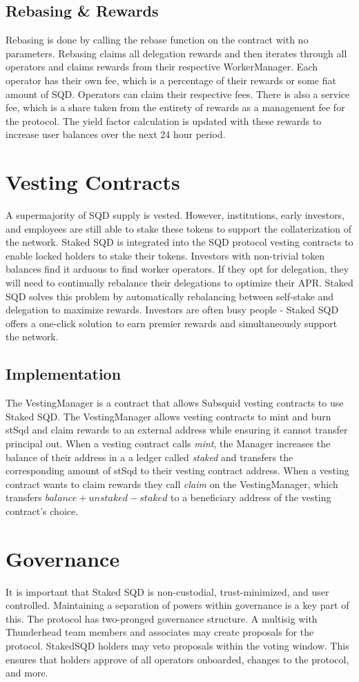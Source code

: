 \documentclass{article}
\begin{document}
\subsection{Rebasing \& Rewards}
Rebasing is done by calling the rebase function on the contract with no parameters. Rebasing claims all delegation rewards and then iterates through all operators and claims rewards from their respective WorkerManager. Each operator has their own fee, which is a percentage of their rewards or some fiat amount of SQD. Operators can claim their respective fees. There is also a service fee, which is a share taken from the entirety of rewards as a management fee for the protocol. The yield factor calculation is updated with these rewards to increase user balances over the next 24 hour period.
\section{Vesting Contracts}
A supermajority of SQD supply is vested\cite{tokenomics}. However, institutions, early investors, and employees are still able to stake these tokens to support the collaterization of the network. Staked SQD is integrated into the SQD protocol vesting contracts to enable locked holders to stake their tokens. Investors with non-trivial token balances find it arduous to find worker operators. If they opt for delegation, they will need to continually rebalance their delegations to optimize their APR. Staked SQD solves this problem by automatically rebalancing between self-stake and delegation to maximize rewards. Investors are often busy people - Staked SQD offers a one-click solution to earn premier rewards and simultaneously support the network.
\subsection{Implementation}
The VestingManager is a contract that allows Subsquid vesting contracts to use Staked SQD. The VestingManager allows vesting contracts to mint and burn stSqd and claim rewards to an external address while ensuring it cannot transfer principal out. When a vesting contract calls \textit{mint}, the Manager increases the balance of their address in a a ledger called \textit{staked} and transfers the corresponding amount of stSqd to their vesting contract address. When a vesting contract wants to claim rewards they call \textit{claim} on the VestingManager, which transfers $balance + unstaked - staked$ to a beneficiary address of the vesting contract's choice. 
\section{Governance}
It is important that Staked SQD is non-custodial, trust-minimized, and user controlled. Maintaining a separation of powers within governance is a key part of this. The protocol has two-pronged governance structure. A multisig with Thunderhead team members and associates may create proposals for the protocol. StakedSQD holders may veto proposals within the voting window. This ensures that holders approve of all operators onboarded, changes to the protocol, and more.
\end{document}
